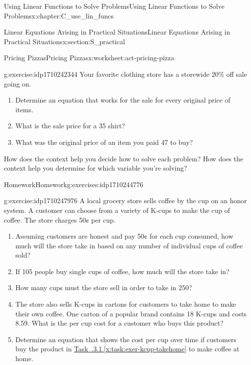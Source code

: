\documentclass[oneside,10pt,]{book}
\newcommand{\xreffont}{\relax}
\numberwithin{equation}{chapter}
\begin{document}
\begin{chapterptx}{Using Linear Functions to Solve Problems}{}{Using Linear Functions to Solve Problems}{}{}{x:chapter:C_use_lin_funcs}
\begin{sectionptx}{Linear Equations Arising in Practical Situations}{}{Linear Equations Arising in Practical Situations}{}{}{x:section:S_practical}
\begin{worksheet-subsection}{Pricing Pizzas}{}{Pricing Pizzas}{}{}{x:worksheet:act-pricing-pizza}
\begin{divisionexercise}{10}{}{}{g:exercise:idp1710242344}%
Your favorite clothing store has a storewide 20\% off sale going on.%
\begin{enumerate}[font=\bfseries,label=(\alph*),ref=\alph*]
\item{}Determine an equation that works for the sale for every original price of items.%
\item{}What is the sale price for a \textdollar{}35 shirt?%
\item{}What was the original price of an item you paid \textdollar{}47 to buy?%
\end{enumerate}
\end{divisionexercise}%
\begin{conclusion}{}%
How does the context help you decide how to solve each problem? How does the context help you determine for which variable you're solving?%
\end{conclusion}%
\end{worksheet-subsection}
\restoregeometry
%
%
\typeout{************************************************}
\typeout{************************************************}
%
\begin{exercises-subsection}{Homework}{}{Homework}{}{}{g:exercises:idp1710244776}
\begin{divisionexercise}{1}{}{}{g:exercise:idp1710247976}%
A local grocery store sells coffee by the cup on an honor system. A customer can choose from a variety of K-cups to make the cup of coffee. The store charges 50¢ per cup.%
\begin{enumerate}[font=\bfseries,label=(\alph*),ref=\alph*]
\item{}Assuming customers are honest and pay 50¢ for each cup consumed, how much will the store take in based on any number of individual cups of coffee sold?%
\item{}If 105 people buy single cups of coffee, how much will the store take in?%
\item{}How many cups must the store sell in order to take in \textdollar{}250?%
\item\label{x:task:exer-kcup-takehome}The store also sells K-cups in cartons for customers to take home to make their own coffee. One carton of a popular brand contains 18 K-cups and costs \textdollar{}8.59. What is the per cup cost for a customer who buys this product?%
\item\label{x:task:exer-kcup-takehome-eq}Determine an equation that shows the cost per cup over time if customers buy the product in \hyperref[x:task:exer-kcup-takehome]{Task~{\xreffont 3.1.3.1}.{\xreffont\ref{x:task:exer-kcup-takehome}}} to make coffee at home.%

\end{enumerate}
\end{divisionexercise}
\end{exercises-subsection}
\end{sectionptx}
\end{chapterptx}
\end{document}

